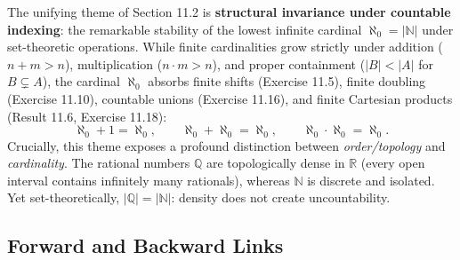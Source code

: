 \documentclass[11pt, letterpaper]{article}
\theoremstyle{definition}
\theoremstyle{remark}
\begin{document}
The unifying theme of Section 11.2 is \textbf{structural invariance under countable indexing}: the remarkable stability of the lowest infinite cardinal $\aleph_0 = |\mathbb{N}|$ under set-theoretic operations. While finite cardinalities grow strictly under addition ($n + m > n$), multiplication ($n \cdot m > n$), and proper containment ($|B| < |A|$ for $B \subsetneq A$), the cardinal $\aleph_0$ absorbs finite shifts (Exercise 11.5), finite doubling (Exercise 11.10), countable unions (Exercise 11.16), and finite Cartesian products (Result 11.6, Exercise 11.18):
\[
\aleph_0 + 1 = \aleph_0, \qquad \aleph_0 + \aleph_0 = \aleph_0, \qquad \aleph_0 \cdot \aleph_0 = \aleph_0.
\]
Crucially, this theme exposes a profound distinction between \textit{order/topology} and \textit{cardinality}. The rational numbers $\mathbb{Q}$ are topologically dense in $\mathbb{R}$ (every open interval contains infinitely many rationals), whereas $\mathbb{N}$ is discrete and isolated. Yet set-theoretically, $|\mathbb{Q}| = |\mathbb{N}|$: density does not create uncountability.

\subsection{Forward and Backward Links}
\end{document}
